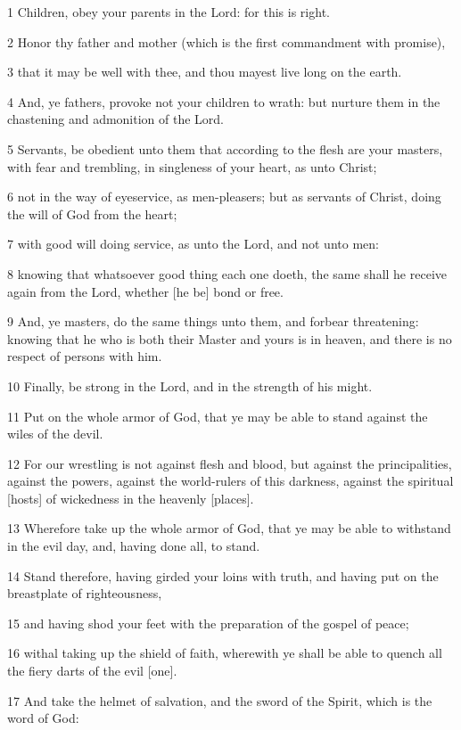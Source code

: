 \par 1 Children, obey your parents in the Lord: for this is right.
\par 2 Honor thy father and mother (which is the first commandment with promise),
\par 3 that it may be well with thee, and thou mayest live long on the earth.
\par 4 And, ye fathers, provoke not your children to wrath: but nurture them in the chastening and admonition of the Lord.
\par 5 Servants, be obedient unto them that according to the flesh are your masters, with fear and trembling, in singleness of your heart, as unto Christ;
\par 6 not in the way of eyeservice, as men-pleasers; but as servants of Christ, doing the will of God from the heart;
\par 7 with good will doing service, as unto the Lord, and not unto men:
\par 8 knowing that whatsoever good thing each one doeth, the same shall he receive again from the Lord, whether [he be] bond or free.
\par 9 And, ye masters, do the same things unto them, and forbear threatening: knowing that he who is both their Master and yours is in heaven, and there is no respect of persons with him.
\par 10 Finally, be strong in the Lord, and in the strength of his might.
\par 11 Put on the whole armor of God, that ye may be able to stand against the wiles of the devil.
\par 12 For our wrestling is not against flesh and blood, but against the principalities, against the powers, against the world-rulers of this darkness, against the spiritual [hosts] of wickedness in the heavenly [places].
\par 13 Wherefore take up the whole armor of God, that ye may be able to withstand in the evil day, and, having done all, to stand.
\par 14 Stand therefore, having girded your loins with truth, and having put on the breastplate of righteousness,
\par 15 and having shod your feet with the preparation of the gospel of peace;
\par 16 withal taking up the shield of faith, wherewith ye shall be able to quench all the fiery darts of the evil [one].
\par 17 And take the helmet of salvation, and the sword of the Spirit, which is the word of God:
